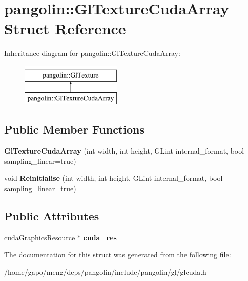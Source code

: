 \hypertarget{structpangolin_1_1_gl_texture_cuda_array}{}\section{pangolin\+:\+:Gl\+Texture\+Cuda\+Array Struct Reference}
\label{structpangolin_1_1_gl_texture_cuda_array}
Inheritance diagram for pangolin\+:\+:Gl\+Texture\+Cuda\+Array\+:\begin{figure}[H]
\begin{center}
\leavevmode
\includegraphics[height=2.000000cm]{structpangolin_1_1_gl_texture_cuda_array}
\end{center}
\end{figure}
\subsection*{Public Member Functions}
\begin{DoxyCompactItemize}
\item 
{\bfseries Gl\+Texture\+Cuda\+Array} (int width, int height, G\+Lint internal\+\_\+format, bool sampling\+\_\+linear=true)\hypertarget{structpangolin_1_1_gl_texture_cuda_array_aa33dc18a2f7491a01480ccd0ab19a407}{}\label{structpangolin_1_1_gl_texture_cuda_array_aa33dc18a2f7491a01480ccd0ab19a407}

\item 
void {\bfseries Reinitialise} (int width, int height, G\+Lint internal\+\_\+format, bool sampling\+\_\+linear=true)\hypertarget{structpangolin_1_1_gl_texture_cuda_array_ab83d262e62926c98256560d1ab317b64}{}\label{structpangolin_1_1_gl_texture_cuda_array_ab83d262e62926c98256560d1ab317b64}

\end{DoxyCompactItemize}
\subsection*{Public Attributes}
\begin{DoxyCompactItemize}
\item 
cuda\+Graphics\+Resource $\ast$ {\bfseries cuda\+\_\+res}\hypertarget{structpangolin_1_1_gl_texture_cuda_array_a9916894dec0e9041f113858b1518934d}{}\label{structpangolin_1_1_gl_texture_cuda_array_a9916894dec0e9041f113858b1518934d}

\end{DoxyCompactItemize}


The documentation for this struct was generated from the following file\+:\begin{DoxyCompactItemize}
\item 
/home/gapo/meng/deps/pangolin/include/pangolin/gl/glcuda.\+h\end{DoxyCompactItemize}
